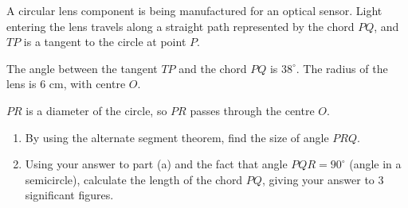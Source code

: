 \documentclass[11pt]{article}
\begin{document}
\begin{question}
\noindent A circular lens component is being manufactured for an optical sensor. Light entering the lens travels along a straight path represented by the chord $PQ$, and $TP$ is a tangent to the circle at point $P$.

\noindent The angle between the tangent $TP$ and the chord $PQ$ is $38^\circ$. The radius of the lens is $6$ cm, with centre $O$.

\begin{center}
\end{center}

\noindent $PR$ is a diameter of the circle, so $PR$ passes through the centre $O$.

\begin{enumerate}
    \item[(a)] By using the alternate segment theorem, find the size of angle $PRQ$.
    \vspace{2.5cm}

    \item[(b)] Using your answer to part (a) and the fact that angle $PQR = 90^\circ$ (angle in a semicircle), calculate the length of the chord $PQ$, giving your answer to 3 significant figures.
    \vspace{4.5cm}
\end{enumerate}
\end{question}
\end{document}
